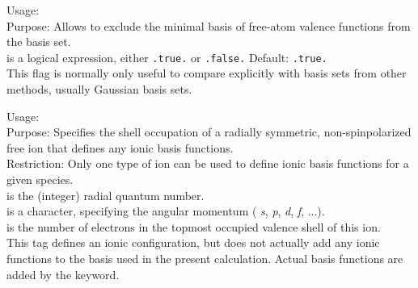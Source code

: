 
{
  \noindent
  Usage:   \\[1.0ex]
  Purpose: Allows to exclude the minimal basis of free-atom valence
    functions from the basis set. \\[1.0ex]
   is a logical expression, either \texttt{.true.} or
    \texttt{.false.} Default: \texttt{.true.} \\
}
This flag is normally only useful to compare explicitly with basis
sets from other methods, usually Gaussian basis sets.

{
  \noindent
  Usage:   
     \\[1.0ex]
  Purpose: Specifies the shell occupation of a radially symmetric,
    non-spinpolarized free ion that defines any ionic basis
    functions. \\[1.0ex]
  Restriction: Only one type of ion can be used to define ionic basis
    functions for a given species. \\[1.0ex]
   is the (integer) radial quantum number. \\
   is a character, specifying the angular momentum (
    \emph{s}, \emph{p}, \emph{d}, \emph{f}, ...). \\
   is the number of electrons in the topmost
    occupied valence shell of this ion. \\
}
This tag defines an ionic configuration, but does not actually add any
ionic functions to the basis used in the present calculation. Actual
basis functions are added by the 
keyword.

